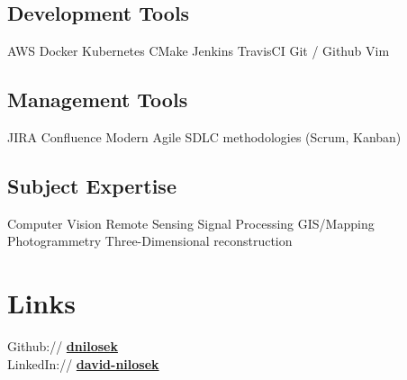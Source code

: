 \documentclass[]{deedy-resume-openfont}
\begin{document}
\begin{minipage}[t]{0.25\textwidth}
\subsection{Development Tools}
AWS \textbullet{} Docker \textbullet{} Kubernetes \textbullet{} CMake \textbullet{} Jenkins \textbullet{} TravisCI \textbullet{} Git / Github \textbullet{} Vim \\
\sectionsep
\subsection{Management Tools}
JIRA \textbullet{} Confluence \textbullet{} Modern Agile SDLC methodologies (Scrum, Kanban)\\
\sectionsep
\subsection{Subject Expertise}
Computer Vision \textbullet{} Remote Sensing \textbullet{} Signal Processing \textbullet{} GIS/Mapping \textbullet{} Photogrammetry \textbullet{} Three-Dimensional reconstruction

\section{Links} 
Github:// \href{https://github.com/dnilosek}{\bf dnilosek} \\
LinkedIn://  \href{https://www.linkedin.com/in/david-nilosek-aab5a696}{\bf david-nilosek} \\



%
%

\end{minipage} 
\hfill
\end{document}
